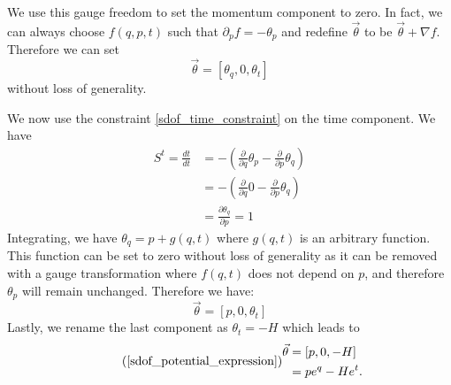 \documentclass[10pt,twocolumn, nofootinbib]{revtex4-2}
\begin{document}
We use this gauge freedom to set the momentum component to zero. In fact, we can always choose $f(q,p,t)$ such that $\partial_p f = -\theta_p$ and redefine $\vec{\theta}$ to be $\vec{\theta} + \nabla f$. Therefore we can set
\begin{equation}
	\vec{\theta} = [\theta_q, 0, \theta_t]
\end{equation}
without loss of generality.

We now use the constraint \ref{sdof_time_constraint} on the time component. We have
\begin{align}
	S^t = \frac{dt}{dt} &= - \left(\frac{\partial}{\partial q}  \theta_p - \frac{\partial}{\partial p}  \theta_q\right) \\
	&= - \left(\frac{\partial}{\partial q}  0 - \frac{\partial}{\partial p}  \theta_q\right) \\
	& = \frac{\partial \theta_q}{\partial p} = 1
\end{align}
Integrating, we have $\theta_q = p + g(q,t)$ where $g(q,t)$ is an arbitrary function. This function can be set to zero without loss of generality as it can be removed with a gauge transformation where $f(q,t)$ does not depend on $p$, and therefore $\theta_p$ will remain unchanged. Therefore we have:
\begin{equation}
	\vec{\theta} = [p, 0, \theta_t]
\end{equation}
Lastly, we rename the last component as $\theta_t = -H$ which leads to 
\begin{equation}
\tag*{(\ref{sdof_potential_expression})}
	\begin{aligned}
		\vec{\theta} &= [p, 0, -H] \\
		&= p e^q - H e^t.
	\end{aligned}
\end{equation}
\end{document}
